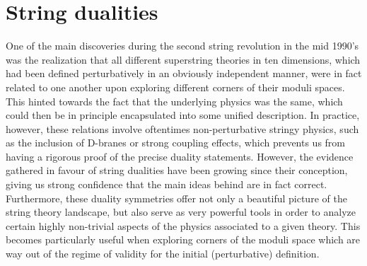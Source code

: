 \section{String dualities} \label{s:dualities}

One of the main discoveries during the second string revolution in the mid 1990's was the realization that all different superstring theories in ten dimensions, which had been defined perturbatively in an obviously independent manner, were in fact related to one another upon exploring different corners of their moduli spaces. This hinted towards the fact that the underlying physics was the same, which could then be in principle encapsulated into some unified description. In practice, however, these relations involve oftentimes non-perturbative stringy physics, such as the inclusion of D-branes or strong coupling effects, which prevents us from having a rigorous proof of the precise duality statements. However, the evidence gathered in favour of string dualities have been growing since their conception, giving us strong confidence that the main ideas behind are in fact correct. Furthermore, these duality symmetries offer not only a beautiful picture of the string theory landscape, but also serve as very powerful tools in order to analyze certain highly non-trivial aspects of the physics associated to a given theory. This becomes particularly useful when exploring corners of the moduli space which are way out of the regime of validity for the initial (perturbative) definition.

